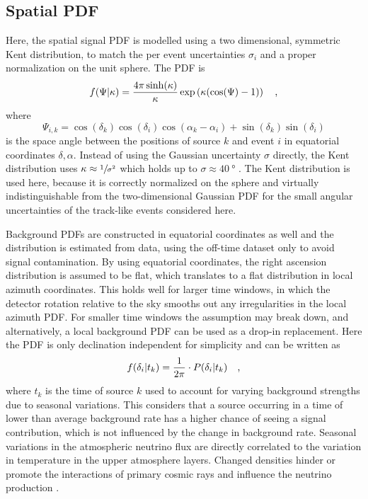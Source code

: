 \subsection*{Spatial PDF}
Here, the spatial signal PDF is modelled using a two dimensional, symmetric Kent distribution, to match the per event uncertainties $\sigma_i$ and a proper normalization on the unit sphere.
The PDF is
\begin{equation}
  f(\Psi|\kappa)
  = \frac{4\pi \sinh(\kappa)}{\kappa}\exp\left(\kappa(\cos(\Psi)-1)\right)
  \quad\text{,}
\end{equation}
where
\begin{equation}
  \Psi_{i,k}
  = \cos(\delta_k)\cos(\delta_i)\cos(\alpha_k - \alpha_i) +
    \sin(\delta_k)\sin(\delta_i)
\end{equation}
is the space angle between the positions of source $k$ and event $i$ in equatorial coordinates $\delta, \alpha$.
Instead of using the Gaussian uncertainty $\sigma$ directly, the Kent distribution uses $\kappa \approx \sfrac{1}{\sigma^2}$ which holds up to $\sigma \approx \SI{40}{\degree}$ \cite{Yasutomi:2014kent,Jakob:2012kent}.
The Kent distribution is used here, because it is correctly normalized on the sphere and virtually indistinguishable from the two-dimensional Gaussian PDF for the small angular uncertainties of the track-like events considered here.

Background PDFs are constructed in equatorial coordinates as well and the distribution is estimated from data, using the off-time dataset only to avoid signal contamination.
By using equatorial coordinates, the right ascension distribution is assumed to be flat, which translates to a flat distribution in local azimuth coordinates.
This holds well for larger time windows, in which the detector rotation relative to the sky smooths out any irregularities in the local azimuth PDF.
For smaller time windows the assumption may break down, and alternatively, a local background PDF can be used as a drop-in replacement.
Here the PDF is only declination independent for simplicity and can be written as
\begin{equation}
  f(\delta_i|t_k) = \frac{1}{2\pi}\cdot P(\delta_i|t_k)
  \quad\text{,}
\end{equation}
where $t_k$ is the time of source $k$ used to account for varying background strengths due to seasonal variations.
This considers that a source occurring in a time of lower than average background rate has a higher chance of seeing a signal contribution, which is not influenced by the change in background rate.
Seasonal variations in the atmospheric neutrino flux are directly correlated to the variation in temperature in the upper atmosphere layers.
Changed densities hinder or promote the interactions of primary cosmic rays and influence the neutrino production \cite{Barret:1952seasons,Gaisser:2010seasons,Gaisser:2013icrc,GRASHORN2010140}.


